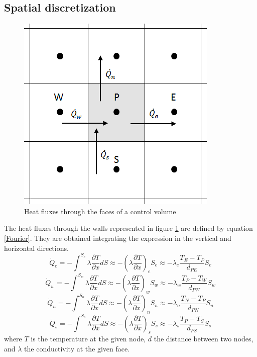 \subsection{Spatial discretization}
\label{SpatialDiscretizationConduction}
\begin{figure}
	\centering
	\includegraphics[scale=0.7]{FourMaterials/controlvolume2d}
	\caption{Heat fluxes through the faces of a control volume}
	\label{convol2d}
\end{figure}
The heat fluxes through the walls represented in figure \ref{convol2d} are defined by equation \ref{Fourier}. They are obtained integrating the expression in the vertical and horizontal directions.
\begin{equation}
\dot{Q}_{e}=-\int_{}^{S_{e}}\lambda\frac{\partial T}{\partial x}dS\approx-\left(\lambda\frac{\partial T}{\partial x}\right)_{e}S_{e}\approx-\lambda_{e}\frac{T_{E}-T_{P}}{d_{PE}}S_{e}
\end{equation}
\begin{equation}
\dot{Q}_{w}=-\int_{}^{S_{w}}\lambda\frac{\partial T}{\partial x}dS\approx-\left(\lambda\frac{\partial T}{\partial x}\right)_{w}S_{w}\approx-\lambda_{w}\frac{T_{P}-T_{W}}{d_{PW}}S_{w}
\end{equation}
\begin{equation}
\dot{Q}_{n}=-\int_{}^{S_{n}}\lambda\frac{\partial T}{\partial x}dS\approx-\left(\lambda\frac{\partial T}{\partial x}\right)_{n}S_{n}\approx-\lambda_{n}\frac{T_{N}-T_{P}}{d_{PN}}S_{n}
\end{equation}
\begin{equation}
\dot{Q}_{s}=-\int_{}^{S_{s}}\lambda\frac{\partial T}{\partial x}dS\approx-\left(\lambda\frac{\partial T}{\partial x}\right)_{s}S_{s}\approx-\lambda_{s}\frac{T_{P}-T_{S}}{d_{PS}}S_{s}
\end{equation}
where $T$ is the temperature at the given node, $d$ the distance between two nodes, and $\lambda$ the conductivity at the given face.

